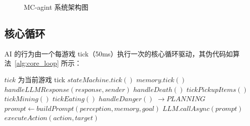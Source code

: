 \documentclass[12pt,a4paper]{article}
\begin{document}
\begin{figure}[H]
    \centering
    \caption{MC-agint 系统架构图}
    \label{fig:architecture}
\end{figure}

\subsection{核心循环}

AI 的行为由一个每游戏 tick（50ms）执行一次的核心循环驱动，其伪代码如算法~\ref{alg:core_loop} 所示：

\begin{algorithm}[H]
\caption{AI 核心循环（每 Tick）}
\label{alg:core_loop}
\begin{algorithmic}[1]
\Require $tick$ 为当前游戏 tick
\State $stateMachine.tick()$
\State $memory.tick()$ 
    \State $handleLLMResponse(response, sender)$
\EndIf
{}
    \State $handleDeath()$
    \State \Return
\EndIf
\State $tickPickupItems()$ 
    \State $tickMining()$
    \State \Return
\EndIf
{}
    \State $tickEating()$
    \State \Return
\EndIf
{}
    \State $handleDanger()$
    \State \Return
\EndIf
{}
            \State $\rightarrow PLANNING$
        \EndIf
    \EndCase
        \State $prompt \gets buildPrompt(perception, memory, goal)$
        \State $LLM.callAsync(prompt)$
    \EndCase
        \State $executeAction(action, target)$
    \EndCase
\EndSwitch
\end{algorithmic}
\end{algorithm}
\end{document}
